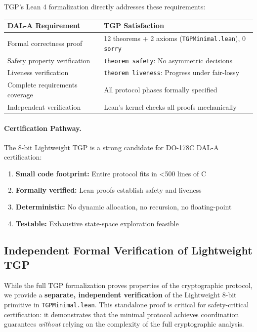 TGP's Lean 4 formalization directly addresses these requirements:

\begin{center}
\begin{tabular}{lp{7cm}}
\toprule
\textbf{DAL-A Requirement} & \textbf{TGP Satisfaction} \\
\midrule
Formal correctness proof & 12 theorems + 2 axioms (\texttt{TGPMinimal.lean}), 0 \texttt{sorry} \\
Safety property verification & \texttt{theorem safety}: No asymmetric decisions \\
Liveness verification & \texttt{theorem liveness}: Progress under fair-lossy \\
Complete requirements coverage & All protocol phases formally specified \\
Independent verification & Lean's kernel checks all proofs mechanically \\
\bottomrule
\end{tabular}
\end{center}

\paragraph{Certification Pathway.}
The 8-bit Lightweight TGP is a strong candidate for DO-178C DAL-A certification:
\begin{enumerate}
    \item \textbf{Small code footprint:} Entire protocol fits in <500 lines of C
    \item \textbf{Formally verified:} Lean proofs establish safety and liveness
    \item \textbf{Deterministic:} No dynamic allocation, no recursion, no floating-point
    \item \textbf{Testable:} Exhaustive state-space exploration feasible
\end{enumerate}

\subsection{Independent Formal Verification of Lightweight TGP}
\label{sec:lightweight-verification}

While the full TGP formalization proves properties of the cryptographic protocol, we provide a \textbf{separate, independent verification} of the Lightweight 8-bit primitive in \texttt{TGPMinimal.lean}. This standalone proof is critical for safety-critical certification: it demonstrates that the minimal protocol achieves coordination guarantees \emph{without} relying on the complexity of the full cryptographic analysis.

